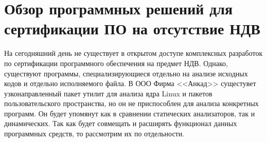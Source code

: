 \section{Обзор программных решений для сертификации ПО на отсутствие НДВ}\label{sec:ch1/sec3}
На сегодняшний день не существует в открытом доступе комплексных разработок по сертификации программного 
обеспечения на предмет НДВ. Однако, существуют программы, специализирующиеся отдельно на анализе исходных кодов
и отдельно исполняемого файла. В ООО Фирма <<Анкад>> сущестувет узконаправленный пакет утилит для анализа ядра 
Linux и пакетов пользовательского пространства, но он не приспособлен для анализа конкретных программ. Он будет 
упомянут как в сравнении статических анализаторов, так и динамических.
Так как {\ProgModule} будет совмещать и расширять функционал
данных программных средств, то рассмотрим их по отдельности.

